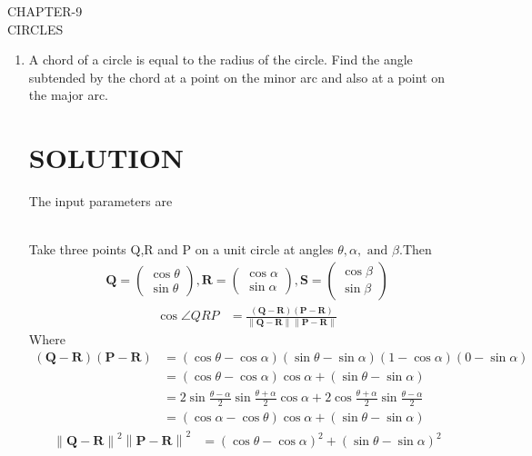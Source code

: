\documentclass[12pt]{article}
\providecommand{\brak}[1]{\ensuremath{\left(#1\right)}}
\providecommand{\norm}[1]{\left\lVert#1\right\rVert}
\newcommand{\myvec}[1]{\ensuremath{\begin{pmatrix}#1\end{pmatrix}}}
\let\vec\mathbf
\begin{document}
\begin{center}
\textbf\large{CHAPTER-9 \\ CIRCLES}

\end{center}
\begin{enumerate}
\section{EXERCISE-10.5}
\item A chord of a circle is equal to the radius of the circle. Find the angle subtended by the chord at a point on the minor arc and also at a point on the major arc.
\section{SOLUTION}
The input parameters are\\
\begin{table}[h!]
	
\caption{}
\label{table}	
\end{table}
\\
Take three points Q,R and P on a unit circle  at angles $\theta,\alpha,\text{ and }\beta$.Then
\begin{align}
	\vec{Q} = \myvec{\cos\theta\\ \sin\theta},
	\vec{R} = \myvec{\cos\alpha\\ \sin\alpha},
	\vec{S} = \myvec{\cos\beta\\ \sin\beta}
\end{align}
\begin{align}
	\cos\angle QRP&= \frac{\brak{\vec{Q}-\vec{R}}\brak{\vec{P}-\vec{R}}}{\norm{\vec{Q}-\vec{R}}\norm{\vec{P}-\vec{R}}}\label{2}
\end{align}
Where
\begin{align}
\brak{\vec{Q}-\vec{R}}\brak{\vec{P}-\vec{R}}&= \brak{\cos\theta-\cos\alpha}\brak{ \sin\theta-\sin\alpha}\brak{1-\cos\alpha}\brak{0-\sin\alpha}\\
&=\brak{\cos\theta-\cos\alpha}\cos\alpha+\brak{\sin\theta-\sin\alpha}\\
&=2\sin\frac{\theta-\alpha}{2}\sin\frac{\theta+\alpha}{2}\cos\alpha+2\cos\frac{\theta+\alpha}{2}\sin\frac{\theta-\alpha}{2}\\
&=\brak{\cos\alpha-\cos\theta}\cos\alpha+\brak{\sin\theta-\sin\alpha}\label{6}
\end{align}
\begin{align}
\norm{\vec{Q}-\vec{R}}^2\norm{\vec{P}-\vec{R}}^2 &= \brak{\cos\theta-\cos\alpha}^2+\brak{\sin\theta-\sin\alpha}^2

\end{align}
\end{enumerate}
\end{document}

